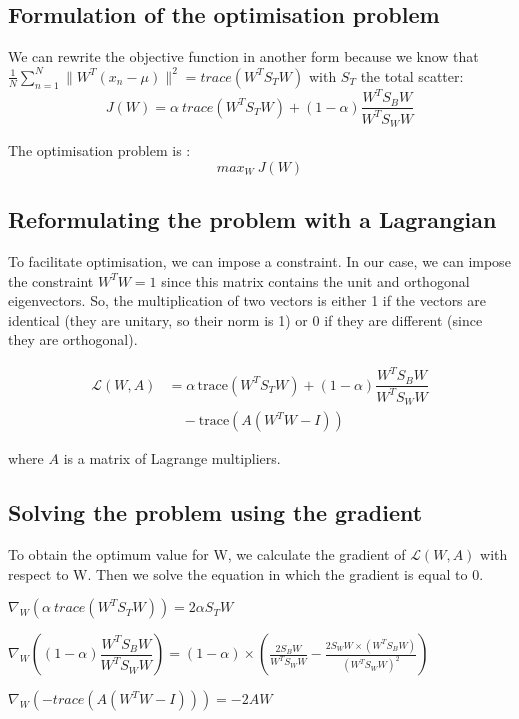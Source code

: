 \subsection{Formulation of the optimisation problem}

We can rewrite the objective function in another form because we know that $ \frac{1}{N} \sum_{n = 1}^{N}{\lVert W^T(x_n - \mu) \rVert^2} = trace(W^TS_TW) $ with $S_T$ the total scatter: $$ J(W) = \alpha \ trace(W^TS_TW) + (1 - \alpha) \dfrac{W^TS_BW}{W^TS_WW}  $$

The optimisation problem is : $$max_W \ J(W)$$

\subsection{Reformulating the problem with a Lagrangian}

To facilitate optimisation, we can impose a constraint. In our case, we can impose the constraint $W^TW = 1$ since this matrix contains the unit and orthogonal eigenvectors. So, the multiplication of two vectors is either 1 if the vectors are identical (they are unitary, so their norm is 1) or 0 if they are different (since they are orthogonal).


\begin{align*}
	\mathcal{L}(W,A) &= \alpha \, \text{trace}(W^T S_T W) + (1 - \alpha) \dfrac{W^T S_B W}{W^T S_W W} \\
	& \quad - \text{trace}(A(W^T W - I))
\end{align*}


where $A$ is a matrix of Lagrange multipliers.

\subsection{Solving the problem using the gradient}

To obtain the optimum value for W, we calculate the gradient of $\mathcal{L}(W,A)$ with respect to W. Then we solve the equation in which the gradient is equal to 0.
\newline 

$\nabla_W (\alpha \ trace(W^TS_TW)) = 2\alpha S_T W$

$\nabla_W ((1 - \alpha) \dfrac{W^TS_BW}{W^TS_WW}) = (1 - \alpha) \times (\frac{2S_BW}{W^TS_WW} - \frac{2S_WW \times (W^TS_BW)}{(W^TS_WW)^2}) $

$\nabla_W (- trace(A(W^TW - I))) = -2AW $
\newline

